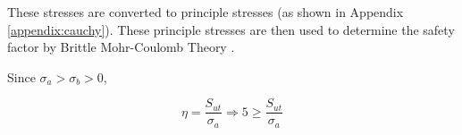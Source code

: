 \documentclass[../main.tex]{subfiles}
\begin{document}
These stresses are converted to principle stresses (as shown in Appendix \ref{appendix:cauchy}). These principle stresses are then used to determine the safety factor by Brittle Mohr-Coulomb Theory \cite[227]{shigley}.

Since $\sigma _a > \sigma _b > 0$,

\begin{equation}
	\eta = \dfrac{S_{ut}}{\sigma _a} \Rightarrow 5 \geq \dfrac{S_{ut}}{\sigma _a}
\end{equation}
\end{document}

